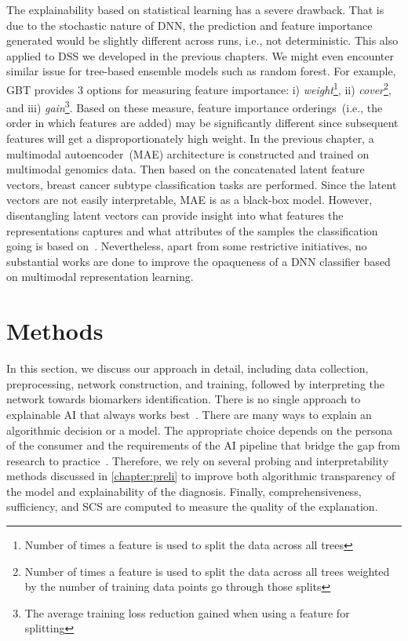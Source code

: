 \hspace*{3.5mm} The explainability based on statistical learning has a severe drawback. That is due to the stochastic nature of DNN, the prediction and feature importance generated would be slightly different across runs, i.e., not deterministic. This also applied to DSS we developed in the previous chapters. We might even encounter similar issue for tree-based ensemble models such as random forest. For example, GBT provides 3 options for measuring feature importance: i) \emph{weight}\footnote{Number of times a feature is used to split the data across all trees}, ii) \emph{cover}\footnote{Number of times a feature is used to split the data across all trees weighted by the number of training data points go through those splits}, and iii) \emph{gain}\footnote{The average training loss reduction gained when using a feature for splitting}. Based on these measure, feature importance orderings~(i.e., the order in which features are added) may be significantly different since subsequent features will get a disproportionately high weight. 
\hspace*{3.5mm} In the previous chapter, a multimodal autoencoder~(MAE) architecture is constructed and trained on multimodal genomics data. Then based on the concatenated latent feature vectors, breast cancer subtype classification tasks are performed. Since the latent vectors are not easily interpretable, MAE is as a black-box model. However, disentangling latent vectors can provide insight into what features the representations captures and what attributes of the samples the classification going is based on~\cite{karimTCBB2020}. Nevertheless, apart from some restrictive initiatives, no substantial works are done to improve the opaqueness of a DNN classifier based on multimodal representation learning. %

\section{Methods}\label{chapter_5:mm}
In this section, we discuss our approach in detail, including data collection, preprocessing, network construction, and training, followed by interpreting the network towards biomarkers identification. There is no single approach to explainable AI that always works best~\cite{arya2019one}. There are many ways to explain an algorithmic decision or a model. The appropriate choice depends on the persona of the consumer and the requirements of the AI pipeline that bridge the gap from research to practice~\cite{arya2019one}. Therefore, we rely on several probing and interpretability methods discussed in \cref{chapter:preli} to improve both algorithmic transparency of the model and explainability of the diagnosis. Finally, comprehensiveness, sufficiency, and SCS are computed to measure the quality of the explanation. 

